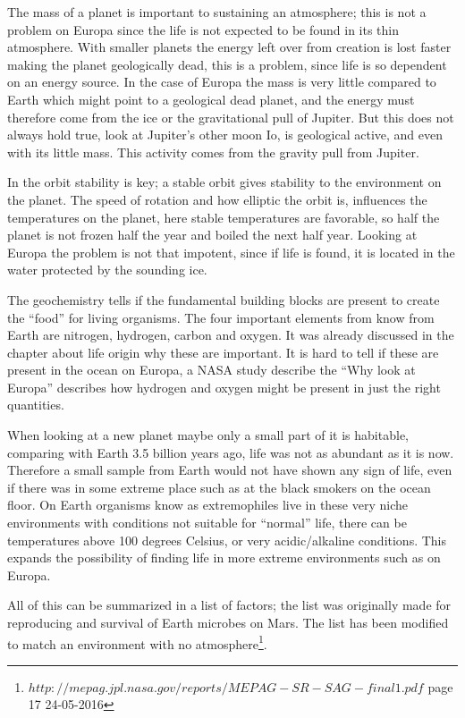 The mass of a planet is important to sustaining an atmosphere; this is not a problem on Europa since the life is not expected to be found in its thin atmosphere. With smaller planets the energy left over from creation is lost faster making the planet geologically dead, this is a problem, since life is so dependent on an energy source. In the case of Europa the mass is very little compared to Earth which might point to a geological dead planet, and the energy must therefore come from the ice or the gravitational pull of Jupiter. But this does not always hold true, look at Jupiter’s other moon Io, is geological active, and even with its little mass. This activity comes from the gravity pull from Jupiter. \par
In the orbit stability is key; a stable orbit gives stability to the environment on the planet. The speed of rotation and how elliptic the orbit is, influences the temperatures on the planet, here stable temperatures are favorable, so half the planet is not frozen half the year and boiled the next half year. Looking at Europa the problem is not that impotent, since if life is found, it is located in the water protected by the sounding ice. \par
The geochemistry tells if the fundamental building blocks are present to create the “food” for living organisms. The four important elements from know from Earth are nitrogen, hydrogen, carbon and oxygen. It was already discussed in the chapter about life origin why these are important.  It is hard to tell if these are present in the ocean on Europa, a NASA study describe the “Why look at Europa” describes how hydrogen and oxygen might be present in just the right quantities.\par

When looking at a new planet maybe only a small part of it is habitable, comparing with Earth 3.5 billion years ago, life was not as abundant as it is now. Therefore a small sample from Earth would not have shown any sign of life, even if there was in some extreme place such as at the black smokers on the ocean floor. On Earth organisms know as extremophiles live in these very niche environments with conditions not suitable for “normal” life, there can be temperatures above 100 degrees Celsius, or very acidic/alkaline conditions. This expands the possibility of finding life in more extreme environments such as on Europa. \par
All of this can be summarized in a list of factors; the list was originally made for reproducing and survival of Earth microbes on Mars. The list has been modified to match an environment with no atmosphere\footnote{$http://mepag.jpl.nasa.gov/reports/MEPAG-SR-SAG-final1.pdf$ page 17 24-05-2016}.

